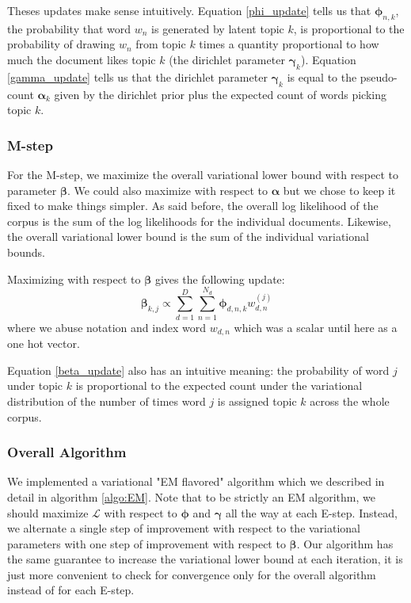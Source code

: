 \documentclass{article}
\begin{document}
Theses updates make sense intuitively. Equation \ref{phi_update} tells us that $\bm{\phi}_{n,k}$, the probability that word $w_n$ is generated by latent topic $k$, is proportional to the probability of drawing $w_n$ from topic $k$ times a quantity proportional to how much the document likes topic $k$ (the dirichlet parameter $\bm{\gamma}_k$). Equation \ref{gamma_update} tells us that the dirichlet parameter $\bm{\gamma}_k$ is equal to the pseudo-count $\bm{\alpha}_k$ given by the dirichlet prior plus the expected count of words picking topic $k$.

\subsubsection{M-step}
For the M-step, we maximize the overall variational lower bound with respect to parameter $\bm{\beta}$. We could also maximize with respect to $\bm{\alpha}$ but we chose to keep it fixed to make things simpler. As said before, the overall log likelihood of the corpus is the sum of the log likelihoods for the individual documents. Likewise, the overall variational lower bound is the sum of the individual variational bounds. 

Maximizing with respect to $\bm{\beta}$ gives the following update:
\begin{equation} 
\label{beta_update}
\bm{\beta}_{k,j} \propto \sum_{d=1}^D \sum_{n=1}^{N_d} \bm{\phi}_{d, n, k}
w_{d,n}^{(j)}
\end{equation}
where we abuse notation and index word $w_{d,n}$ which was a scalar until here as a one hot vector.

Equation \ref{beta_update} also has an intuitive meaning: the probability of word $j$ under topic $k$ is proportional to the expected count under the variational distribution of the number of times word $j$ is assigned topic $k$ across the whole corpus.

\subsubsection{Overall Algorithm}
We implemented a variational "EM flavored" algorithm which we described in detail in algorithm \ref{algo:EM}. Note that to be strictly an EM algorithm, we should maximize $\mathcal{L}$ with respect to $\bm{\phi}$ and $\bm{\gamma}$ all the way at each E-step. Instead, we alternate a single step of improvement with respect to the variational parameters with one step of improvement with respect to $\bm{\beta}$. Our algorithm has the same guarantee to increase the variational lower bound at each iteration, it is just more convenient to check for convergence only for the overall algorithm instead of for each E-step.
\end{document}

